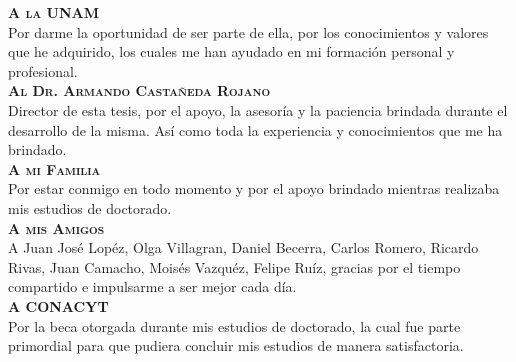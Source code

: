 \begin{agradecimientos}
  \textbf{\textsc{A la UNAM}}\\

  Por darme la oportunidad de ser parte de ella, por los conocimientos
  y valores que he adquirido, los cuales me han ayudado en mi
  formación personal y profesional.\\

  \textbf{\textsc{Al Dr. Armando Castañeda Rojano}}\\

  Director de esta tesis, por el apoyo, la asesoría y la paciencia
  brindada durante el desarrollo de la misma. Así como toda la
  experiencia y conocimientos que me ha brindado.\\

  \textbf{\textsc{A mi Familia}}\\

  Por estar conmigo en todo momento y por el apoyo brindado mientras
  realizaba mis estudios de doctorado.\\

  \textbf{\textsc{A mis Amigos}}\\

  A Juan José Lopéz, Olga Villagran, Daniel Becerra, Carlos Romero,
  Ricardo Rivas, Juan Camacho, Moisés Vazquéz, Felipe Ruíz, gracias
  por el tiempo compartido e impulsarme a ser mejor cada día.\\

  \textbf{\textsc{A CONACYT}}\\

  Por la beca otorgada durante mis estudios de doctorado, la cual fue
  parte primordial para que pudiera concluir mis estudios de manera
  satisfactoria.\\
\end{agradecimientos}